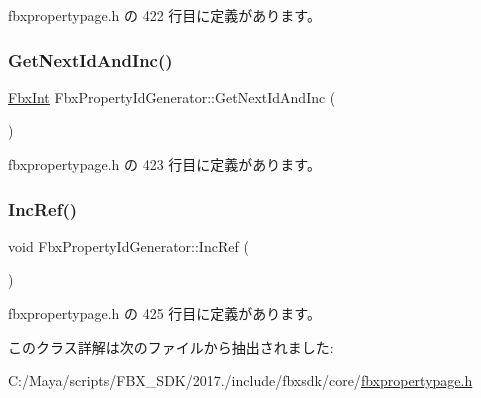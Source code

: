  fbxpropertypage.\+h の 422 行目に定義があります。

\mbox{\label{class_fbx_property_id_generator_a77a349020d3d25a78b19131b2c62aaa9}} 
\subsubsection{\texorpdfstring{Get\+Next\+Id\+And\+Inc()}{GetNextIdAndInc()}}
{\footnotesize\ttfamily \hyperlink{fbxtypes_8h_a088fa96de3b0b3ea69f0f6afef525dfb}{Fbx\+Int} Fbx\+Property\+Id\+Generator\+::\+Get\+Next\+Id\+And\+Inc (\begin{DoxyParamCaption}{ }\end{DoxyParamCaption})\hspace{0.3cm}{\ttfamily [inline]}}



 fbxpropertypage.\+h の 423 行目に定義があります。

\mbox{\label{class_fbx_property_id_generator_ac1834015b7a1fa1fe47ebf93737b03e0}} 
\subsubsection{\texorpdfstring{Inc\+Ref()}{IncRef()}}
{\footnotesize\ttfamily void Fbx\+Property\+Id\+Generator\+::\+Inc\+Ref (\begin{DoxyParamCaption}{ }\end{DoxyParamCaption})\hspace{0.3cm}{\ttfamily [inline]}}



 fbxpropertypage.\+h の 425 行目に定義があります。



このクラス詳解は次のファイルから抽出されました\+:\begin{DoxyCompactItemize}
\item 
C\+:/\+Maya/scripts/\+F\+B\+X\+\_\+\+S\+D\+K/2017./include/fbxsdk/core/\hyperlink{fbxpropertypage_8h}{fbxpropertypage.\+h}\end{DoxyCompactItemize}
